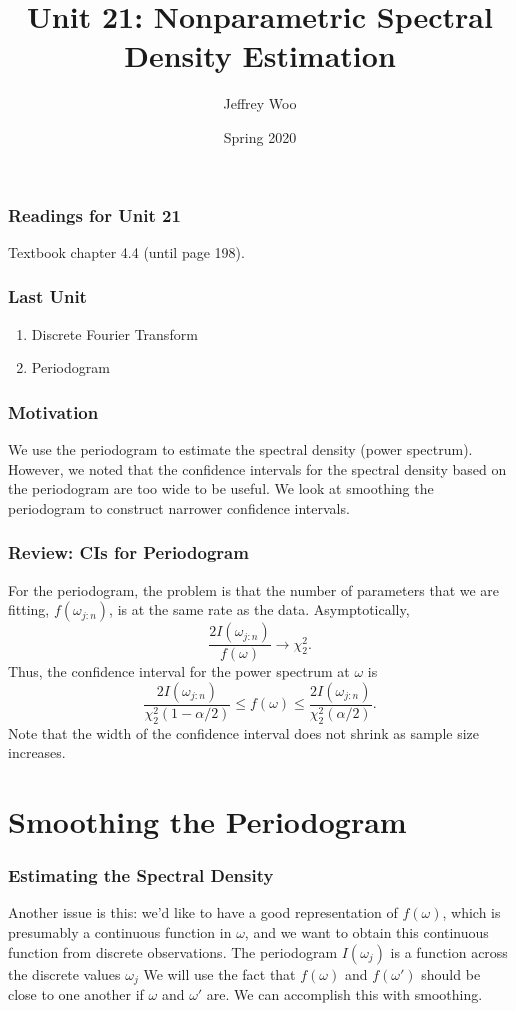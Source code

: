 \documentclass[%
xcolor=pdftex]{beamer}
\title{Unit 21: Nonparametric Spectral Density Estimation}
\author[STAT 5170: Applied Time Series, Unit 21]{Jeffrey Woo}
\institute{Department of Statistics, University of Virginia}
\date{Spring 2020}
\begin{document}
\frame{\titlepage}


\begin{frame}
\frametitle{Readings for Unit 21}

Textbook chapter 4.4 (until page 198).

\end{frame}




\begin{frame}
\frametitle{Last Unit}
\begin{enumerate}
\item Discrete Fourier Transform
\item Periodogram
\end{enumerate}
\end{frame}

\begin{frame}
\frametitle{Motivation}

We use the periodogram to estimate the spectral density (power spectrum). However, we noted that the confidence intervals for the spectral density based on the periodogram are too wide to be useful. We look at smoothing the periodogram to construct narrower confidence intervals.


\end{frame}


\begin{frame}
\frametitle{Review: CIs for Periodogram}

For the periodogram,  the problem is that the number of parameters that we are fitting, $f(\omega_{j:n})$, is \underline{\hspace{15 mm}} at the same rate as the data. Asymptotically,
$$
\frac{2 I(\omega_{j:n}) }{f(\omega)} \rightarrow \chi_2^2.
$$
Thus, the confidence interval for the power spectrum at $\omega$ is
$$
\frac{2 I(\omega_{j:n}) }{\chi_2^2(1-\alpha/2)} \leq f(\omega) \leq \frac{2 I(\omega_{j:n}) }{\chi_2^2(\alpha/2)}.
$$
Note that the width of the confidence interval does not shrink as sample size increases.

\end{frame}





\section{Smoothing the Periodogram}
\frame{\tableofcontents[currentsection]}

\begin{frame}
\frametitle{Estimating the Spectral Density}

Another issue is this: we'd like to have a
good representation of $f(\omega)$, which is presumably a
continuous function in $\omega$, and we want to obtain this
continuous function from discrete observations. The periodogram $I(\omega_j)$ is a function across the discrete
values $\omega_j$  We will use the fact that $f(\omega)$
and $f(\omega')$ should be close to one another if $\omega$ and
$\omega'$ are.  We can accomplish this with smoothing.

\end{frame}
\end{document}
